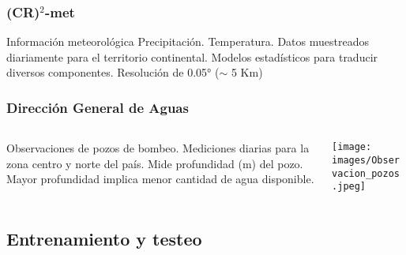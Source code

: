 \documentclass{beamer}
\begin{document}
  \begin{frame}
    \frametitle{(CR)$^2$-met}

    \begin{outline}
      \1 Información meteorológica
        \2 Precipitación.
        \2 Temperatura.
      \1 Datos muestreados diariamente para el territorio continental.
      \1 Modelos estadísticos para traducir diversos componentes.  
      \1 Resolución de 0.05° ($\sim$ 5 Km)
    \end{outline}

  \end{frame}

  \begin{frame}
    \frametitle{Dirección General de Aguas}

    \begin{columns}
    
      \begin{column}{0.5\textwidth}
        \begin{outline}
          \1 Observaciones de pozos de bombeo.
          \1 Mediciones diarias para la zona centro y norte del país.
          \1 Mide profundidad (m) del pozo.
            \2 Mayor profundidad implica menor cantidad de agua disponible.
        \end{outline}
      \end{column}

      \begin{column}{0.5\textwidth}
        \centering
        \texttt{[image: images/Observacion\_pozos.jpeg]}
      \end{column}

    \end{columns}
  \end{frame}


  \subsection*{Entrenamiento y testeo}
\end{document}
